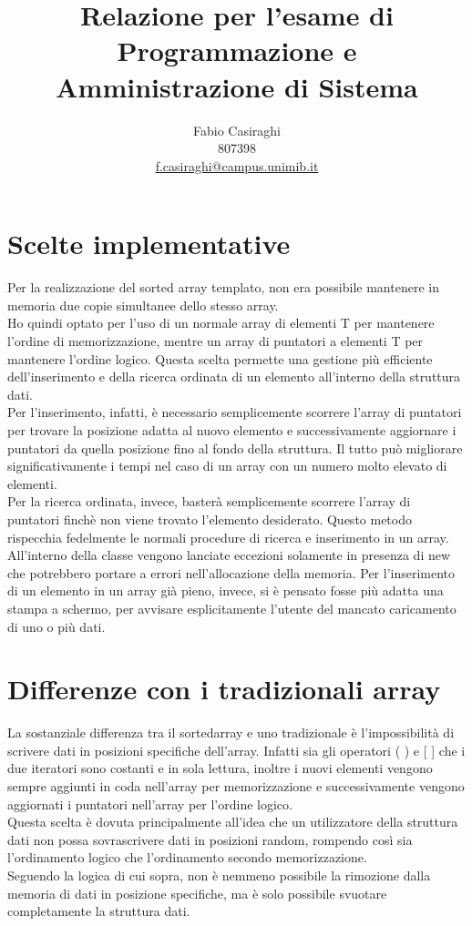 \documentclass[11pt]{article}
\author{Fabio Casiraghi \\807398 \\ \href{mailto:f.casiraghi@campus.unimib.it} {f.casiraghi@campus.unimib.it}}
\title{Relazione per l'esame di Programmazione e Amministrazione di Sistema}
\begin{document}
\maketitle
\vspace{2cm}

\section*{Scelte implementative}
Per la realizzazione del sorted array templato, non era possibile mantenere in memoria
due copie simultanee dello stesso array. \\
Ho quindi optato per l'uso di un normale array di elementi T per mantenere l'ordine di memorizzazione,
mentre un array di puntatori a elementi T per mantenere l'ordine logico. Questa scelta permette
una gestione più efficiente dell'inserimento e della ricerca ordinata di un elemento all'interno della
struttura dati.\\
Per l'inserimento, infatti, è necessario semplicemente scorrere l'array di puntatori per trovare la 
posizione adatta al nuovo elemento e successivamente aggiornare i puntatori da quella posizione fino al fondo
della struttura. Il tutto può migliorare significativamente i tempi nel caso di un array 
con un numero molto elevato di elementi.\\
Per la ricerca ordinata, invece, basterà semplicemente scorrere l'array di puntatori finchè non viene 
trovato l'elemento desiderato. Questo metodo rispecchia fedelmente le normali procedure di ricerca e inserimento 
in un array.\\
All'interno della classe vengono lanciate eccezioni solamente in presenza di new che potrebbero portare a 
errori nell'allocazione della memoria. Per l'inserimento di un elemento in un array già pieno, invece, si 
è pensato fosse più adatta una stampa a schermo, per avvisare esplicitamente l'utente del mancato caricamento di 
uno o più dati.
\section*{Differenze con i tradizionali array}
La sostanziale differenza tra il sortedarray e uno tradizionale è l'impossibilità di scrivere dati in posizioni specifiche dell'array. Infatti sia gli operatori ( ) e [ ] che i due iteratori sono costanti e in sola lettura, inoltre i nuovi elementi vengono sempre aggiunti in coda nell'array per memorizzazione e successivamente vengono aggiornati i puntatori nell'array per l'ordine logico.\\
Questa scelta è dovuta principalmente all'idea che un utilizzatore della struttura dati non possa sovrascrivere dati in posizioni random, rompendo così sia l'ordinamento logico che l'ordinamento secondo memorizzazione.\\
Seguendo la logica di cui sopra, non è nemmeno possibile la rimozione dalla memoria di dati in posizione specifiche, ma è solo possibile svuotare completamente la struttura dati.
\end{document}
